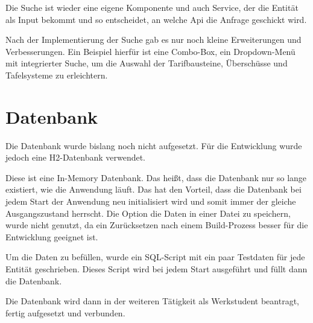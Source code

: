 Die Suche ist wieder eine eigene Komponente und auch Service, der die Entität als Input bekommt und so entscheidet, an welche Api die Anfrage geschickt wird.

Nach der Implementierung der Suche gab es nur noch kleine Erweiterungen und Verbesserungen. Ein Beispiel hierfür ist eine Combo-Box, ein Dropdown-Menü mit integrierter Suche,
um die Auswahl der Tarifbausteine, Überschüsse und Tafelsysteme zu erleichtern.
\section{Datenbank}
Die Datenbank wurde bislang noch nicht aufgesetzt. Für die Entwicklung wurde jedoch eine H2-Datenbank verwendet. 

Diese ist eine In-Memory Datenbank. Das heißt, dass die Datenbank nur so lange existiert, wie die Anwendung läuft.
Das hat den Vorteil, dass die Datenbank bei jedem Start der Anwendung neu initialisiert wird und somit immer der gleiche Ausgangszustand herrscht.
Die Option die Daten in einer Datei zu speichern, wurde nicht genutzt, da ein Zurücksetzen nach einem Build-Prozess besser für die Entwicklung geeignet ist.

Um die Daten zu befüllen, wurde ein SQL-Script mit ein paar Testdaten für jede Entität geschrieben. Dieses Script wird bei jedem Start ausgeführt und
füllt dann die Datenbank.

Die Datenbank wird dann in der weiteren Tätigkeit als Werkstudent beantragt, fertig aufgesetzt und verbunden.



